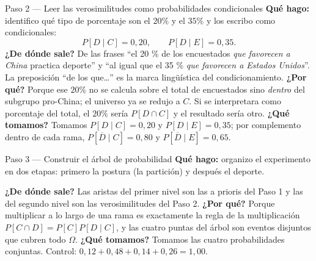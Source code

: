 \documentclass[11pt]{article}
\begin{document}
\begin{sol}
\begin{paso}{Paso 2 --- Leer las verosimilitudes como probabilidades condicionales}
\textbf{Qu\'e hago:} identifico qu\'e tipo de porcentaje son el $20\%$ y el $35\%$ y los escribo como condicionales:
\[
P[D\mid C]=0{,}20,\qquad P[D\mid E]=0{,}35 .
\]
\textbf{¿De d\'onde sale?} De las frases ``el 20 \% de los encuestados \emph{que favorecen a China} practica deporte'' y ``al igual que el 35 \% \emph{que favorecen a Estados Unidos}''. La preposici\'on ``de los que\dots'' es la marca ling\"u\'istica del condicionamiento.
\textbf{¿Por qu\'e?} Porque ese $20\%$ no se calcula sobre el total de encuestados sino \emph{dentro} del subgrupo pro-China; el universo ya se redujo a $C$. Si se interpretara como porcentaje del total, el $20\%$ ser\'ia $P[D\cap C]$ y el resultado ser\'ia otro.
\textbf{¿Qu\'e tomamos?} Tomamos $P[D\mid C]=0{,}20$ y $P[D\mid E]=0{,}35$; por complemento dentro de cada rama, $P[\overline{D}\mid C]=0{,}80$ y $P[\overline{D}\mid E]=0{,}65$.
\end{paso}

\begin{paso}{Paso 3 --- Construir el \'arbol de probabilidad}
\textbf{Qu\'e hago:} organizo el experimento en dos etapas: primero la postura (la partici\'on) y despu\'es el deporte.

\begin{center}
\shorthandoff{<>}
\shorthandon{<>}
\end{center}

\textbf{¿De d\'onde sale?} Las aristas del primer nivel son las a prioris del Paso 1 y las del segundo nivel son las verosimilitudes del Paso 2.
\textbf{¿Por qu\'e?} Porque multiplicar a lo largo de una rama es exactamente la regla de la multiplicaci\'on $P[C\cap D]=P[C]P[D\mid C]$, y las cuatro puntas del \'arbol son eventos disjuntos que cubren todo $\Omega$.
\textbf{¿Qu\'e tomamos?} Tomamos las cuatro probabilidades conjuntas. Control: $0{,}12+0{,}48+0{,}14+0{,}26=1{,}00$.
\end{paso}


\end{sol}
\end{document}
